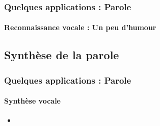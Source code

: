 \documentclass[xcolor=table]{beamer}
\begin{document}
\begin{frame}
	\frametitle{Quelques applications : Parole}
	\framesubtitle{Reconnaissance vocale : Un peu d'humour}
		\begin{center}
		\end{center}
\end{frame}

\subsection{Synthèse de la parole}

\begin{frame}
	\frametitle{Quelques applications : Parole}
	\framesubtitle{Synthèse vocale}
	\begin{itemize}
		\item 
	\end{itemize}
\end{frame}


\end{document}
